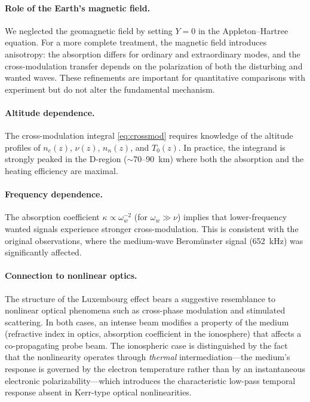 \documentclass[12pt]{article}
\begin{document}
\paragraph{Role of the Earth's magnetic field.}
We neglected the geomagnetic field by setting $Y = 0$ in the Appleton--Hartree equation.
For a more complete treatment, the magnetic field introduces anisotropy: the absorption
differs for ordinary and extraordinary modes, and the cross-modulation transfer depends on
the polarization of both the disturbing and wanted waves.  These refinements are important
for quantitative comparisons with experiment but do not alter the fundamental mechanism.

\paragraph{Altitude dependence.}
The cross-modulation integral \eqref{eq:crossmod} requires knowledge of the altitude
profiles of $n_e(z)$, $\nu(z)$, $n_n(z)$, and $T_0(z)$.  In practice, the integrand is
strongly peaked in the D-region ($\sim$70--90~km) where both the absorption and the
heating efficiency are maximal.

\paragraph{Frequency dependence.}
The absorption coefficient $\kappa \propto \omega_w^{-2}$ (for $\omega_w \gg \nu$) implies
that lower-frequency wanted signals experience stronger cross-modulation.  This is
consistent with the original observations, where the medium-wave Berom\"unster signal
(652~kHz) was significantly affected.

\paragraph{Connection to nonlinear optics.}
The structure of the Luxembourg effect bears a suggestive resemblance to nonlinear optical
phenomena such as cross-phase modulation and stimulated scattering.  In both cases, an
intense beam modifies a property of the medium (refractive index in optics, absorption
coefficient in the ionosphere) that affects a co-propagating probe beam.  The ionospheric
case is distinguished by the fact that the nonlinearity operates through \emph{thermal}
intermediation---the medium's response is governed by the electron temperature rather than
by an instantaneous electronic polarizability---which introduces the characteristic
low-pass temporal response absent in Kerr-type optical nonlinearities.
\end{document}
